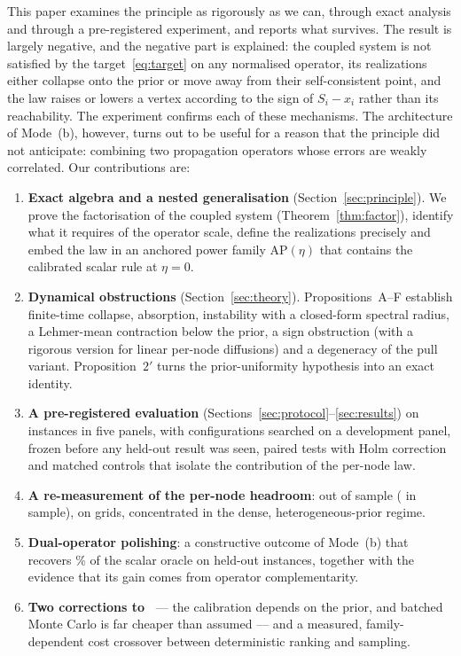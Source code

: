 \documentclass[11pt,a4paper]{article}
\theoremstyle{definition}
\theoremstyle{plain}
\newcommand{\AP}{\mathrm{AP}}
\begin{document}
This paper examines the principle as rigorously as we can, through exact analysis and through a pre-registered experiment, and reports what survives. The result is largely negative, and the negative part is explained: the coupled system is not satisfied by the target~\eqref{eq:target} on any normalised operator, its realizations either collapse onto the prior or move away from their self-consistent point, and the law raises or lowers a vertex according to the sign of $S_i-x_i$ rather than its reachability. The experiment confirms each of these mechanisms. The architecture of Mode~(b), however, turns out to be useful for a reason that the principle did not anticipate: combining two propagation operators whose errors are weakly correlated. Our contributions are:
\begin{enumerate}[label=(\roman*)]
\item \textbf{Exact algebra and a nested generalisation} (Section~\ref{sec:principle}). We prove the factorisation of the coupled system (Theorem~\ref{thm:factor}), identify what it requires of the operator scale, define the realizations precisely and embed the law in an anchored power family $\AP(\eta)$ that contains the calibrated scalar rule at $\eta=0$.
\item \textbf{Dynamical obstructions} (Section~\ref{sec:theory}). Propositions~A--F establish finite-time collapse, absorption, instability with a closed-form spectral radius, a Lehmer-mean contraction below the prior, a sign obstruction (with a rigorous version for linear per-node diffusions) and a degeneracy of the pull variant. Proposition~$2'$ turns the prior-uniformity hypothesis into an exact identity.
\item \textbf{A pre-registered evaluation} (Sections~\ref{sec:protocol}--\ref{sec:results}) on \NTotal{} instances in five panels, with \CfgTotal{} configurations searched on a development panel, \NFrozen{} frozen before any held-out result was seen, paired tests with Holm correction and matched controls that isolate the contribution of the per-node law.
\item \textbf{A re-measurement of the per-node headroom}: \HeadAll{} out of sample (\HeadApparent{} in sample), \HeadGrid{} on grids, concentrated in the dense, heterogeneous-prior regime.
\item \textbf{Dual-operator polishing}: a constructive outcome of Mode~(b) that recovers \TestLinNinePctOracle\% of the scalar oracle on held-out instances, together with the evidence that its gain comes from operator complementarity.
\item \textbf{Two corrections to~\cite{konstantellos26}} --- the calibration depends on the prior, and batched Monte Carlo is far cheaper than assumed --- and a measured, family-dependent cost crossover between deterministic ranking and sampling.
\end{enumerate}
\end{document}
